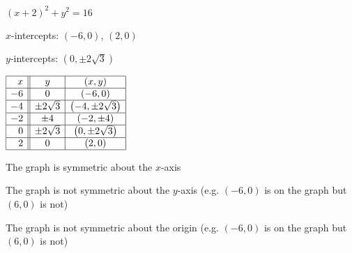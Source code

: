 {$(x+2)^2+y^2 = 16$}
{$x$-intercepts: $(-6, 0)$, $(2,0)$  \smallskip

$y$-intercepts: $\left(0, \pm 2\sqrt{3}\right)$  \smallskip

$\begin{array}{|r||c|c|}  

\hline
 x &   y & (x,y) \\ \hline
-6 & 0 & (-6,0) \\  \hline
-4 & \pm 2 \sqrt{3} & \left(-4,\pm 2 \sqrt{3}\right) \\ \hline
 -2 &  \pm 4 & (-2, \pm 4) \\ \hline
0 &  \pm 2 \sqrt{3} & \left(0,\pm 2 \sqrt{3}\right) \\ \hline
 2 &  0 & (2, 0) \\ \hline
 
 
\end{array} $ \smallskip


\smallskip

The graph is symmetric about the $x$-axis \smallskip

The graph is not symmetric about the $y$-axis (e.g. $(-6, 0)$ is on the graph but $(6, 0)$ is not) \smallskip

The graph is not symmetric about the origin (e.g. $(-6, 0)$ is on the graph but $(6, 0)$ is not) }